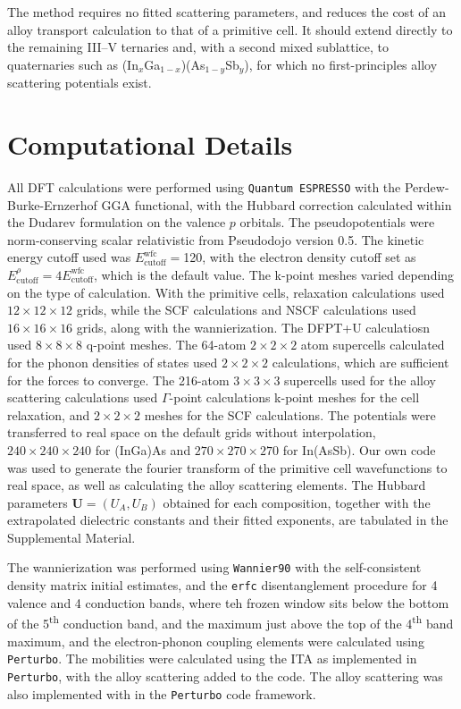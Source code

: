 \documentclass[aps,prmaterials,reprint,amsmath,amssymb,superscriptaddress]{revtex4-2}
\begin{document}
The method requires no fitted scattering parameters, and reduces the cost of an alloy transport calculation to that of a primitive cell. It should extend directly to the remaining III--V ternaries and, with a second mixed sublattice, to quaternaries such as (In$_x$Ga$_{1-x}$)(As$_{1-y}$Sb$_y$), for which no first-principles alloy scattering potentials exist.

\section{Computational Details}\label{sec:details}

All DFT calculations were performed using \texttt{Quantum ESPRESSO}\cite{QE1,QE2,QE3} with the Perdew-Burke-Ernzerhof\cite{Perdew1996} GGA functional, with the Hubbard correction calculated within the Dudarev formulation\cite{DFTU_Dudarev} on the valence $p$ orbitals. The pseudopotentials were norm-conserving scalar relativistic from Pseudodojo version 0.5\cite{pseudodojo1,pseudodojo2}. 
The kinetic energy cutoff used was $E^\text{wfc}_\text{cutoff}=$\SI{120}{\rydberg}, with the electron density cutoff set as $E^\rho_\text{cutoff}=4E^\text{wfc}_\text{cutoff}$, which is the default value. The k-point meshes varied depending on the type of calculation. With the primitive cells, relaxation calculations used $12 \times 12 \times 12$ grids, while the SCF calculations and NSCF calculations used $16 \times 16 \times 16$ grids, along with the wannierization. The DFPT+U calculatiosn used $8 \times 8 \times 8$ q-point meshes. The 64-atom $2 \times 2 \times 2$ atom supercells calculated for the phonon densities of states used $2\times 2 \times 2$ calculations, which are sufficient for the forces to converge. The 216-atom $3 \times 3 \times 3$ supercells used for the alloy scattering calculations used $\Gamma$-point calculations k-point meshes for the cell relaxation, and $2 \times 2 \times 2$ meshes for the SCF calculations. The potentials were transferred to real space on the default grids without interpolation, $240 \times 240 \times 240$ for (InGa)As and $270 \times 270 \times 270$ for In(AsSb). Our own code was used to generate the fourier transform of the primitive cell wavefunctions to real space, as well as calculating the alloy scattering elements. 
The Hubbard parameters $\bm{U}=(U_A,U_B)$ obtained for each composition, together with the extrapolated dielectric constants and their fitted exponents, are tabulated in the Supplemental Material.

The wannierization was performed using \texttt{Wannier90}\cite{w901_Mostofi2008,w903_Pizzi2020} with the self-consistent density matrix initial estimates, and the \texttt{erfc} disentanglement procedure for 4 valence and 4 conduction bands, where teh frozen window sits below the bottom of the 5\textsuperscript{th} conduction band, and the maximum just above the top of the 4\textsuperscript{th} band maximum, and the electron-phonon coupling elements were calculated using \texttt{Perturbo}\cite{Perturbo1}. The mobilities were calculated using the ITA as implemented in \texttt{Perturbo}, with the alloy scattering added to the code. The alloy scattering was also implemented with in the \texttt{Perturbo} code framework. 
\end{document}
